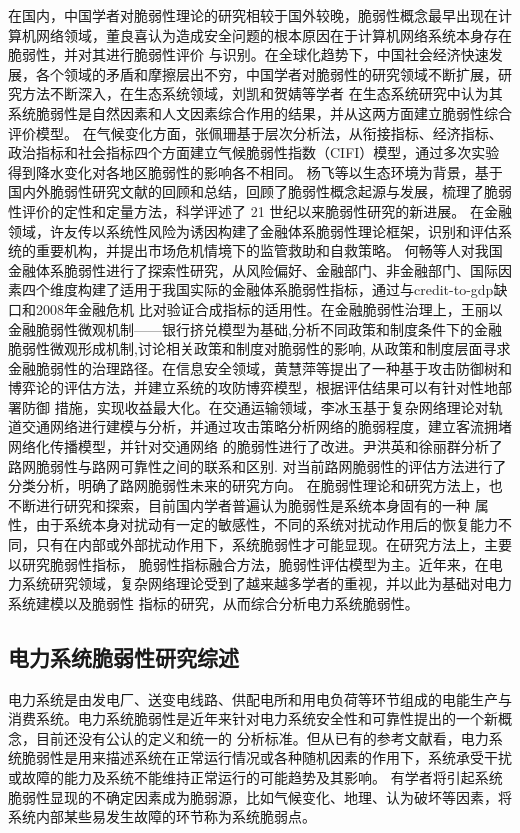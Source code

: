 在国内，中国学者对脆弱性理论的研究相较于国外较晚，脆弱性概念最早出现在计算机网络领域，董良喜认为造成安全问题的根本原因在于计算机网络系统本身存在脆弱性，并对其进行脆弱性评价
与识别\cite{refs17}。在全球化趋势下，中国社会经济快速发展，各个领域的矛盾和摩擦层出不穷，中国学者对脆弱性的研究领域不断扩展，研究方法不断深入，在生态系统领域，刘凯和贺婧等学者
在生态系统研究中认为其系统脆弱性是自然因素和人文因素综合作用的结果，并从这两方面建立脆弱性综合评价模型\cite{refs18,refs19}。
在气候变化方面，张佩珊基于层次分析法，从衔接指标、经济指标、政治指标和社会指标四个方面建立气候脆弱性指数（CIFI）模型，通过多次实验得到降水变化对各地区脆弱性的影响各不相同\cite{refs20}。
杨飞等以生态环境为背景，基于国内外脆弱性研究文献的回顾和总结，回顾了脆弱性概念起源与发展，梳理了脆弱性评价的定性和定量方法，科学评述了 21 世纪以来脆弱性研究的新进展\cite{refs21}。
在金融领域，许友传以系统性风险为诱因构建了金融体系脆弱性理论框架，识别和评估系统的重要机构，并提出市场危机情境下的监管救助和自救策略\cite{refs22}。
何畅等人对我国金融体系脆弱性进行了探索性研究，从风险偏好、金融部门、非金融部门、国际因素四个维度构建了适用于我国实际的金融体系脆弱性指标，通过与credit-to-gdp缺口和2008年金融危机
比对验证合成指标的适用性\cite{refs23}。在金融脆弱性治理上，王丽以金融脆弱性微观机制——银行挤兑模型为基础,分析不同政策和制度条件下的金融脆弱性微观形成机制,讨论相关政策和制度对脆弱性的影响,
从政策和制度层面寻求金融脆弱性的治理路径\cite{refs24}。在信息安全领域，黄慧萍等提出了一种基于攻击防御树和博弈论的评估方法，并建立系统的攻防博弈模型，根据评估结果可以有针对性地部署防御
措施，实现收益最大化\cite{refs25,refs26}。在交通运输领域，李冰玉基于复杂网络理论对轨道交通网络进行建模与分析，并通过攻击策略分析网络的脆弱程度，建立客流拥堵网络化传播模型，并针对交通网络
的脆弱性进行了改进\cite{refs27}。尹洪英和徐丽群分析了路网脆弱性与路网可靠性之间的联系和区别. 对当前路网脆弱性的评估方法进行了分类分析，明确了路网脆弱性未来的研究方向\cite{refs28}。
在脆弱性理论和研究方法上，也不断进行研究和探索，目前国内学者普遍认为脆弱性是系统本身固有的一种
属性，由于系统本身对扰动有一定的敏感性，不同的系统对扰动作用后的恢复能力不同，只有在内部或外部扰动作用下，系统脆弱性才可能显现。在研究方法上，主要以研究脆弱性指标\cite{refs29}，
脆弱性指标融合方法\cite{refs30}，脆弱性评估模型为主。近年来，在电力系统研究领域，复杂网络理论\cite{refs31}受到了越来越多学者的重视，并以此为基础对电力系统建模以及脆弱性
指标的研究，从而综合分析电力系统脆弱性。


\subsection{电力系统脆弱性研究综述}
\label{sec:presentPowerSys}
电力系统是由发电厂、送变电线路、供配电所和用电负荷等环节组成的电能生产与消费系统。电力系统脆弱性是近年来针对电力系统安全性和可靠性提出的一个新概念，目前还没有公认的定义和统一的
分析标准。但从已有的参考文献看，电力系统脆弱性是用来描述系统在正常运行情况或各种随机因素的作用下，系统承受干扰或故障的能力及系统不能维持正常运行的可能趋势及其影响\cite{refs32}。
有学者将引起系统脆弱性显现的不确定因素成为脆弱源，比如气候变化、地理、认为破坏等因素，将系统内部某些易发生故障的环节称为系统脆弱点。

